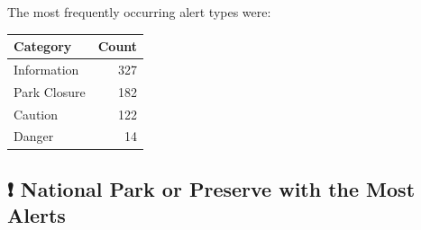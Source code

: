 \documentclass[
  letterpaper,
  DIV=11,
  numbers=noendperiod]{scrartcl}
\begin{document}
The most frequently occurring alert types were:

\begin{longtable}[]{@{}lr@{}}
\toprule\noalign{}
Category & Count \\
\midrule\noalign{}
\endhead
\bottomrule\noalign{}
\endlastfoot
Information & 327 \\
Park Closure & 182 \\
Caution & 122 \\
Danger & 14 \\
\end{longtable}

\subsection{❗ National Park or Preserve with the Most
Alerts}\label{national-park-or-preserve-with-the-most-alerts}
\end{document}
